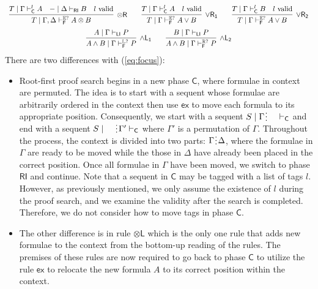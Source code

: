 \documentclass[submission,copyright,creativecommons]{eptcs}
\theoremstyle{definition}
\newcommand{\tl}{\otimes \mathsf{L}}
\newcommand{\tr}{\otimes \mathsf{R}}
\newcommand{\andlone}{\land \mathsf{L_{1}}}
\newcommand{\andltwo}{\land \mathsf{L_{2}}}
\newcommand{\orrone}{\lor \mathsf{R_{1}}}
\newcommand{\orrtwo}{\lor \mathsf{R_{2}}}
\newcommand{\ot}{\otimes}
\newcommand{\C}{\mathsf{C}}
\newcommand{\RI}{\mathsf{RI}}
\newcommand{\LI}{\mathsf{LI}}
\newcommand{\F}{\mathsf{F}}
\newcommand{\tL}{\mathbb{L}}
\newcommand{\tR}{\mathbb{R}}
\newcommand{\tE}{\mathbb{E}}
\newcommand{\ex}{\mathsf{ex}}
\newcommand{\spl}{\raisebox{-1.5pt}[0.5\height]{\hspace{1pt}\vdots\hspace{1pt}}}
\begin{document}
\begin{equation}
\begin{array}{lc}
{    }
    \\[10pt]
    \multicolumn{2}{c}{
    \infer[\tr]{T \mid \Gamma , \Delta \vdash^{\tE?}_{\F} A \ot B}{
      T \mid \Gamma \vdash^{l}_{\C} A
      &
      {-} \mid \Delta \vdash_{\RI} B
      &
      l \ \text{valid}
    }
    \qquad
    \infer[\orrone]{T \mid \Gamma \vdash^{\tE?}_{\F} A \lor B}{
      T \mid \Gamma \vdash^{l}_{\C} A
      &
      l \ \text{valid}
    }
    \qquad
    \infer[\orrtwo]{T \mid \Gamma \vdash^{\tE?}_{\F} A \lor B}{
      T \mid \Gamma \vdash^{l}_{\C} B
      &
      l \ \text{valid}
    }
    }
    \\[6pt]
    \multicolumn{2}{c}{
    \infer[\andlone]{A \land B \mid \Gamma \vdash^{\tL?}_{\F} P}{A \mid \Gamma \vdash_{\LI} P}
    \qquad
    \infer[\andltwo]{A \land B \mid \Gamma \vdash^{\tR?}_{\F} P}{B \mid \Gamma \vdash_{\LI} P}
    }
  \end{array}
\end{equation}
There are two differences with (\ref{eq:focus}):
\begin{itemize}
  \item Root-first proof search begins in a new phase $\C$, where formulae in context are permuted.
  The idea is to start with a sequent whose formulae are arbitrarily ordered in the context then use $\ex$ to move each formula to its appropriate position.
  Consequently, we start with a sequent $S \mid \Gamma \spl \quad \vdash_{\C}$ and end with a sequent $S \mid \quad \spl \Gamma' \vdash_{\C}$ where $\Gamma'$ is a permutation of $\Gamma$.
  Throughout the process, the context is divided into two parts: $\Gamma \spl \Delta$, where the formulae in $\Gamma$ are ready to be moved while the those in $\Delta$ have already been placed in the correct position.
  Once all formulae in $\Gamma$ have been moved, we switch to phase $\RI$ and continue.
  Note that a sequent in $\C$ may be tagged with a list of tags $l$.
  However, as previously mentioned, we only assume the existence of $l$ during the proof search, and we examine the validity after the search is completed.
  Therefore, we do not consider how to move tags in phase $\C$.
  \item The other difference is in rule $\tl$ which is the only one rule that adds new formulae to the context from the bottom-up reading of the rules.
  The premises of these rules are now required to go back to phase $\C$ to utilize the rule $\ex$ to relocate the new formula $A$ to its correct position within the context.
\end{itemize}
\end{document}

